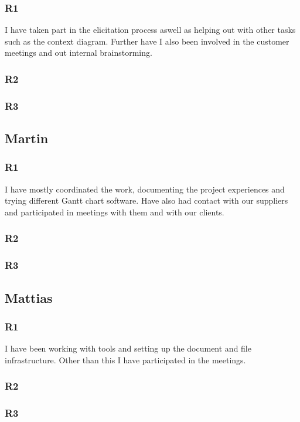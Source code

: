 \documentclass[a4paper]{article}
\begin{document}
    \subsubsection{R1}
    I have taken part in the elicitation process aswell as helping out with other tasks such as the context diagram. Further have I also been involved in the customer meetings and out internal brainstorming.
    \subsubsection{R2}
    \subsubsection{R3}
  
  \subsection{Martin}
    \subsubsection{R1}
    I have mostly coordinated the work, documenting the project experiences and trying different Gantt chart software. Have also had contact with our suppliers and participated in meetings with them and with our clients.
    \subsubsection{R2}
    \subsubsection{R3}
  
  \subsection{Mattias}
    \subsubsection{R1}
    I have been working with tools and setting up the document and file infrastructure. Other than this I have participated in the meetings.
    \subsubsection{R2}
    \subsubsection{R3}
\end{document}
